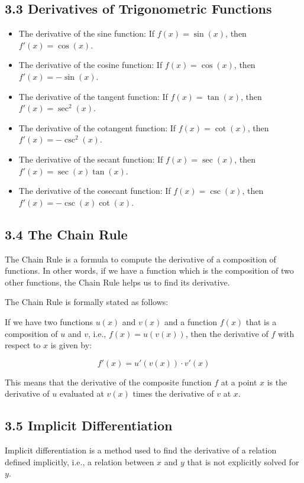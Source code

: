 \documentclass{article}
\begin{document}
\subsection{3.3 Derivatives of Trigonometric Functions}
\begin{itemize}
\item The derivative of the sine function: If \(f(x) = \sin(x)\), then \(f'(x) = \cos(x)\).
\item The derivative of the cosine function: If \(f(x) = \cos(x)\), then \(f'(x) = -\sin(x)\).
\item The derivative of the tangent function: If \(f(x) = \tan(x)\), then \(f'(x) = \sec^2(x)\).
\item The derivative of the cotangent function: If \(f(x) = \cot(x)\), then \(f'(x) = -\csc^2(x)\).
\item The derivative of the secant function: If \(f(x) = \sec(x)\), then \(f'(x) = \sec(x)\tan(x)\).
\item The derivative of the cosecant function: If \(f(x) = \csc(x)\), then \(f'(x) = -\csc(x)\cot(x)\).
\end{itemize}
\subsection{3.4 The Chain Rule}
The Chain Rule is a formula to compute the derivative of a composition of functions. In other words, if we have a function which is the composition of two other functions, the Chain Rule helps us to find its derivative.

The Chain Rule is formally stated as follows:

If we have two functions \(u(x)\) and \(v(x)\) and a function \(f(x)\) that is a composition of \(u\) and \(v\), i.e., \(f(x) = u(v(x))\), then the derivative of \(f\) with respect to \(x\) is given by:

\[f'(x) = u'(v(x)) \cdot v'(x)\]

This means that the derivative of the composite function \(f\) at a point \(x\) is the derivative of \(u\) evaluated at \(v(x)\) times the derivative of \(v\) at \(x\).

\subsection{3.5 Implicit Differentiation}
Implicit differentiation is a method used to find the derivative of a relation defined implicitly, i.e., a relation between \(x\) and \(y\) that is not explicitly solved for \(y\).
\end{document}

